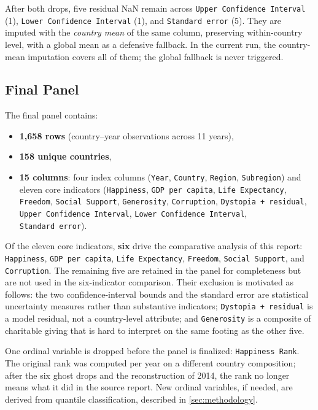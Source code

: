 After both drops, five residual NaN remain across \texttt{Upper\ Confidence\ Interval} (1), \texttt{Lower\ Confidence\ Interval} (1), and \texttt{Standard\ error} (5). They are imputed with the \emph{country mean} of the same column, preserving within-country level, with a global mean as a defensive fallback. In the current run, the country-mean imputation covers all of them; the global fallback is never triggered.

\subsection{Final Panel}
\label{sec:data-cleaning-final}

The final panel contains:
\begin{itemize}
	\item \textbf{1,658 rows} (country--year observations across 11 years),
	\item \textbf{158 unique countries},
	\item \textbf{15 columns}: four index columns (\texttt{Year}, \texttt{Country}, \texttt{Region}, \texttt{Subregion}) and eleven core indicators (\texttt{Happiness}, \texttt{GDP\ per\ capita}, \texttt{Life\ Expectancy}, \texttt{Freedom}, \texttt{Social\ Support}, \texttt{Generosity}, \texttt{Corruption}, \texttt{Dystopia\ +\ residual}, \texttt{Upper\ Confidence\ Interval}, \texttt{Lower\ Confidence\ Interval}, \texttt{Standard\ error}).
\end{itemize}

Of the eleven core indicators, \textbf{six} drive the comparative analysis of this report: \texttt{Happiness}, \texttt{GDP\ per\ capita}, \texttt{Life\ Expectancy}, \texttt{Freedom}, \texttt{Social\ Support}, and \texttt{Corruption}. The remaining five are retained in the panel for completeness but are not used in the six-indicator comparison. Their exclusion is motivated as follows: the two confidence-interval bounds and the standard error are statistical uncertainty measures rather than substantive indicators; \texttt{Dystopia\ +\ residual} is a model residual, not a country-level attribute; and \texttt{Generosity} is a composite of charitable giving that is hard to interpret on the same footing as the other five.

One ordinal variable is dropped before the panel is finalized: \texttt{Happiness\ Rank}. The original rank was computed per year on a different country composition; after the six ghost drops and the reconstruction of 2014, the rank no longer means what it did in the source report. New ordinal variables, if needed, are derived from quantile classification, described in \cref{sec:methodology}.
